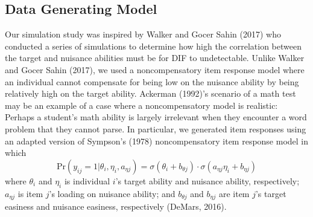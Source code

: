 \documentclass[
  english,
  man,floatsintext]{apa6}
\begin{document}
\hypertarget{data-generating-model}{%
\subsection{Data Generating Model}\label{data-generating-model}}

Our simulation study was inspired by Walker and Gocer Sahin (2017) who conducted a series of simulations to determine how high the correlation between the target and nuisance abilities must be for DIF to undetectable. Unlike Walker and Gocer Sahin (2017), we used a noncompensatory item response model where an individual cannot compensate for being low on the nuisance ability by being relatively high on the target ability. Ackerman (1992)'s scenario of a math test may be an example of a case where a noncompensatory model is realistic: Perhaps a student's math ability is largely irrelevant when they encounter a word problem that they cannot parse. In particular, we generated item responses using an adapted version of Sympson's (1978) noncompensatory item response model in which
\begin{equation}
\text{Pr}(y_{ij} = 1 | \theta_i, \eta_i, a_{\eta j}) = \sigma(\theta_i + b_{\theta j}) \cdot \sigma(a_{\eta j}\eta_i + b_{\eta j})
\end{equation}
where \(\theta_i\) and \(\eta_i\) is individual \(i\)'s target ability and nuisance ability, respectively; \(a_{\eta j}\) is item \(j\)'s loading on nuisance ability; and \(b_{\theta j}\) and \(b_{\eta j}\) are item \(j\)'s target easiness and nuisance easiness, respectively (DeMars, 2016).
\end{document}
